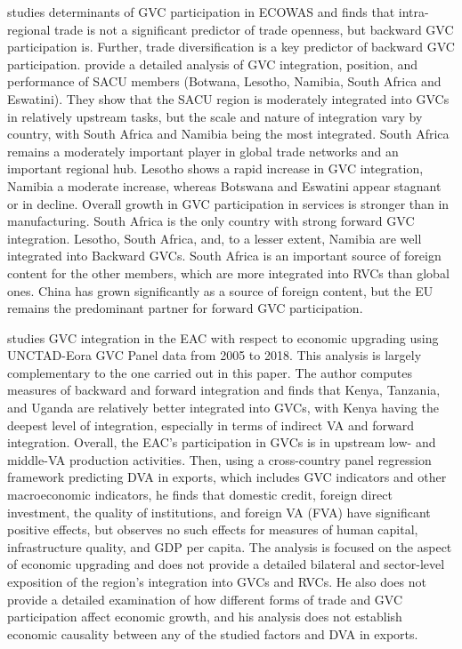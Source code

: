 \documentclass[a4paper]{article}
\begin{document}
\citet{tinta2017determinants} studies determinants of GVC participation in ECOWAS and finds that intra-regional trade is not a significant predictor of trade openness, but backward GVC participation is. Further, trade diversification is a key predictor of backward GVC participation. \citet{engel2016sacu} provide a detailed analysis of GVC integration, position, and performance of SACU members (Botwana, Lesotho, Namibia, South Africa and Eswatini). They show that the SACU region is moderately integrated into GVCs in relatively upstream tasks, but the scale and nature of integration vary by country, with South Africa and Namibia being the most integrated. South Africa remains a moderately important player in global trade networks and an important regional hub. Lesotho shows a rapid increase in GVC integration, Namibia a moderate increase, whereas Botswana and Eswatini appear stagnant or in decline. Overall growth in GVC participation in services is stronger than in manufacturing. South Africa is the only country with strong forward GVC integration. Lesotho, South Africa, and, to a lesser extent, Namibia are well integrated into Backward GVCs. South Africa is an important source of foreign content for the other members, which are more integrated into RVCs than global ones. China has grown significantly as a source of foreign content, but the EU remains the predominant partner for forward GVC participation. \newline 

\citet{lwesya2022integration} studies GVC integration in the EAC with respect to economic upgrading using UNCTAD-Eora GVC Panel data from 2005 to 2018. This analysis is largely complementary to the one carried out in this paper. The author computes measures of backward and forward integration and finds that Kenya, Tanzania, and Uganda are relatively better integrated into GVCs, with Kenya having the deepest level of integration, especially in terms of indirect VA and forward integration. Overall, the EAC's participation in GVCs is in upstream low- and middle-VA production activities. Then, using a cross-country panel regression framework predicting DVA in exports, which includes GVC indicators and other macroeconomic indicators, he finds that domestic credit, foreign direct investment, the quality of institutions, and foreign VA (FVA) have significant positive effects, but observes no such effects for measures of human capital, infrastructure quality, and GDP per capita. The analysis is focused on the aspect of economic upgrading and does not provide a detailed bilateral and sector-level exposition of the region's integration into GVCs and RVCs. He also does not provide a detailed examination of how different forms of trade and GVC participation affect economic growth, and his analysis does not establish economic causality between any of the studied factors and DVA in exports. \newline
\end{document}
